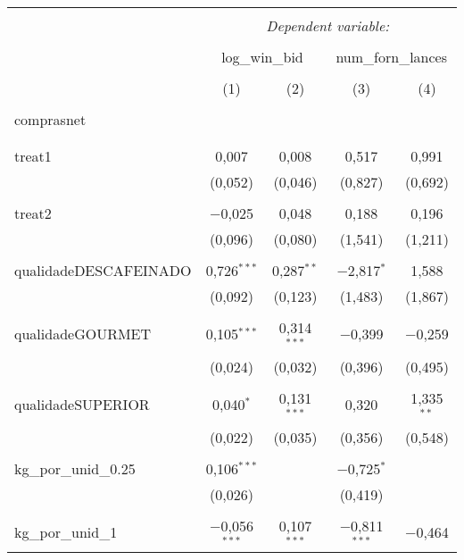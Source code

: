 
\begin{table}[!htbp] \centering 
  \caption{} 
  \label{} 
\begin{tabular}{@{\extracolsep{5pt}}lcccc} 
\\[-1.8ex]\hline 
\hline \\[-1.8ex] 
 & \multicolumn{4}{c}{\textit{Dependent variable:}} \\ 
\cline{2-5} 
\\[-1.8ex] & \multicolumn{2}{c}{log\_win\_bid} & \multicolumn{2}{c}{num\_forn\_lances} \\ 
\\[-1.8ex] & (1) & (2) & (3) & (4)\\ 
\hline \\[-1.8ex] 
 comprasnet &  &  &  &  \\ 
  &  &  &  &  \\ 
  & & & & \\ 
 treat1 & 0,007 & 0,008 & 0,517 & 0,991 \\ 
  & (0,052) & (0,046) & (0,827) & (0,692) \\ 
  & & & & \\ 
 treat2 & $-$0,025 & 0,048 & 0,188 & 0,196 \\ 
  & (0,096) & (0,080) & (1,541) & (1,211) \\ 
  & & & & \\ 
 qualidadeDESCAFEINADO & 0,726$^{***}$ & 0,287$^{**}$ & $-$2,817$^{*}$ & 1,588 \\ 
  & (0,092) & (0,123) & (1,483) & (1,867) \\ 
  & & & & \\ 
 qualidadeGOURMET & 0,105$^{***}$ & 0,314$^{***}$ & $-$0,399 & $-$0,259 \\ 
  & (0,024) & (0,032) & (0,396) & (0,495) \\ 
  & & & & \\ 
 qualidadeSUPERIOR & 0,040$^{*}$ & 0,131$^{***}$ & 0,320 & 1,335$^{**}$ \\ 
  & (0,022) & (0,035) & (0,356) & (0,548) \\ 
  & & & & \\ 
 kg\_por\_unid\_0.25 & 0,106$^{***}$ &  & $-$0,725$^{*}$ &  \\ 
  & (0,026) &  & (0,419) &  \\ 
  & & & & \\ 
 kg\_por\_unid\_1 & $-$0,056$^{***}$ & 0,107$^{***}$ & $-$0,811$^{***}$ & $-$0,464 \\ 

\end{tabular}
\end{table}
